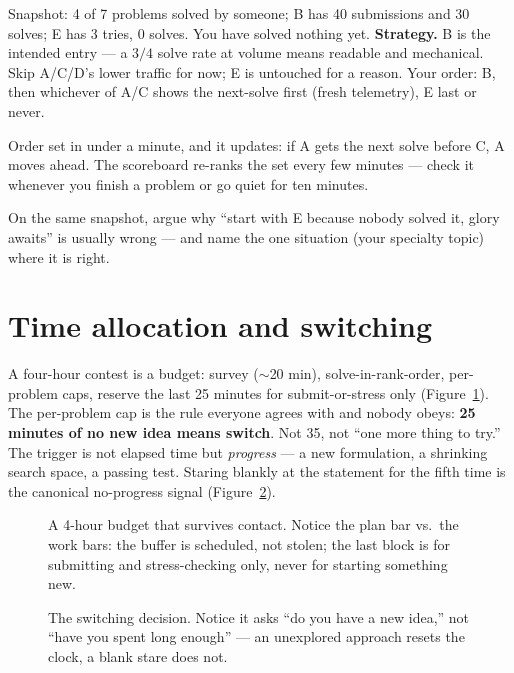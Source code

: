 \begin{example}
Snapshot: 4 of 7 problems solved by someone; B has 40
submissions and 30 solves; E has 3 tries, 0 solves. You have
solved nothing yet.
\textbf{Strategy.} B is the intended entry --- a $3/4$ solve
rate at volume means readable and mechanical. Skip A/C/D's
lower traffic for now; E is untouched for a reason. Your order:
B, then whichever of A/C shows the next-solve first (fresh
telemetry), E last or never.
\end{example}
\begin{solution}
Order set in under a minute, and it updates: if A gets the next
solve before C, A moves ahead. The scoreboard re-ranks the set
every few minutes --- check it whenever you finish a problem or
go quiet for ten minutes.
\end{solution}

\begin{exercise}[easy] On the same snapshot, argue why ``start
with E because nobody solved it, glory awaits'' is usually
wrong --- and name the one situation (your specialty topic)
where it is right.\end{exercise}

\section{Time allocation and switching}\label{sec:time}
A four-hour contest is a budget: survey ($\sim$20 min),
solve-in-rank-order, per-problem caps, reserve the last
25 minutes for submit-or-stress only
(Figure~\ref{fig:time}). The per-problem cap is the rule
everyone agrees with and nobody obeys: \textbf{25 minutes of
no new idea means switch}. Not 35, not ``one more thing to
try.'' The trigger is not elapsed time but \emph{progress}
--- a new formulation, a shrinking search space, a passing
test. Staring blankly at the statement for the fifth time is
the canonical no-progress signal (Figure~\ref{fig:switch}).
\begin{figure}[ht]\centering

\caption{A 4-hour budget that survives contact. Notice the
plan bar vs.\ the work bars: the buffer is scheduled, not
stolen; the last block is for submitting and stress-checking
only, never for starting something new.}
\label{fig:time}
\end{figure}
\begin{figure}[ht]\centering

\caption{The switching decision. Notice it asks ``do you have
a new idea,'' not ``have you spent long enough'' --- an
unexplored approach resets the clock, a blank stare does not.}
\label{fig:switch}
\end{figure}

